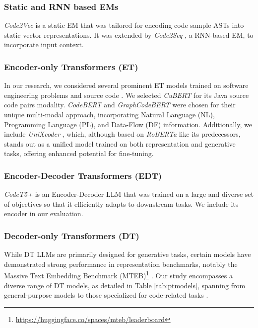\subsubsection{Static and RNN based EMs}
\textit{Code2Vec} \cite{alon2018code2vec} is a static EM that was tailored for encoding code sample ASTs into static vector representations. It was extended by \textit{Code2Seq} \cite{alon2019code2seq}, a RNN-based EM, to incorporate input context.

\subsubsection{Encoder-only Transformers (ET)}
In our research, we considered several prominent ET models trained on software engineering problems and source code \cite{niu2023codeembedreview}. We selected \textit{CuBERT} \cite{kanade2020cubert} for its Java source code pairs modality. \textit{CodeBERT} \cite{feng2020codebert} and \textit{GraphCodeBERT} \cite{guo2021graphcodebert} were chosen for their unique multi-modal approach, incorporating Natural Language (NL), Programming Language (PL), and Data-Flow (DF) information. Additionally, we include \textit{UniXcoder} \cite{guo2022unixcoder}, which, although based on \textit{RoBERTa} \cite{liu2019roberta} like its predecessors, stands out as a unified model trained on both representation and generative tasks, offering enhanced potential for fine-tuning.
\subsubsection{Encoder-Decoder Transformers (EDT)}
\textit{CodeT5+} \cite{wang2023codet5p} is an Encoder-Decoder LLM that was trained on a large and diverse set of objectives so that it efficiently adapts to downstream tasks. We include its encoder in our evaluation.
\subsubsection{Decoder-only Transformers (DT)}
While DT LLMs are primarily designed for generative tasks, certain models \cite{wang2024e5mistral} have demonstrated strong performance in representation benchmarks, notably the Massive Text Embedding Benchmark (MTEB)\footnote{\label{footnote:mteb}\url{https://huggingface.co/spaces/mteb/leaderboard}} \cite{muennighoff2022mteb}. Our study encompasses a diverse range of DT models, as detailed in Table \ref{tab:ptmodels}, spanning from general-purpose models \cite{aimeta2024llama3modelcard} to those specialized for code-related tasks \cite{rozière2024codellama}.
